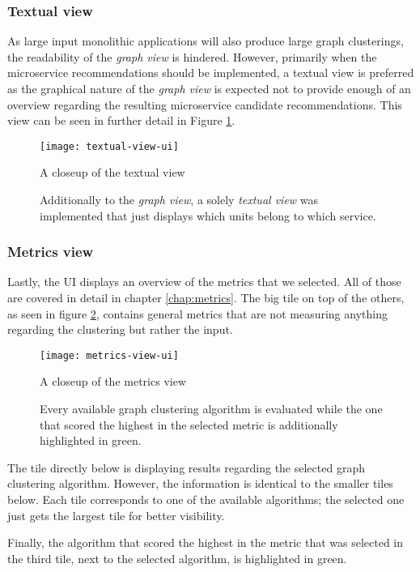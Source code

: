 \documentclass[12pt,a4paper]{report}
\begin{document}
\subsubsection{Textual view}
As large input monolithic applications will also
produce large graph clusterings, the readability of the \textit{graph view} is
hindered. However, primarily when the microservice recommendations should be
implemented, a textual view is preferred as the graphical nature of the
\textit{graph view} is expected not to provide enough of an overview regarding
the resulting microservice candidate recommendations. This view can be seen in
further detail in Figure \ref{fig:textual-view-ui}.

\begin{figure}[htbp]
\centering
\texttt{[image: textual-view-ui]}
\caption{A closeup of the textual view}
\caption*{\centering
  Additionally to the \textit{graph view}, a solely \textit{textual view}
  was implemented that just displays which units belong to which service.
}
\label{fig:textual-view-ui}
\end{figure}


\subsubsection{Metrics view}
Lastly, the UI displays an overview of the metrics
that we selected. All of those are covered in detail in chapter
\ref{chap:metrics}. The big tile on top of the others, as seen in figure
\ref{fig:metrics-view-ui}, contains general metrics that are not measuring
anything regarding the clustering but rather the input.

\begin{figure}[htbp]
\centering
\texttt{[image: metrics-view-ui]}
\caption{A closeup of the metrics view}
\caption*{\centering
  Every available graph clustering algorithm is evaluated while the one that
  scored the highest in the selected metric is additionally highlighted in green.
}
\label{fig:metrics-view-ui}
\end{figure}

The tile directly below is displaying results regarding the selected graph
clustering algorithm. However, the information is identical to the smaller
tiles below. Each tile corresponds to one of the available algorithms; the
selected one just gets the largest tile for better visibility.

Finally, the algorithm that scored the highest in the metric that was selected
in the third tile, next to the selected algorithm, is highlighted in green.
\end{document}
